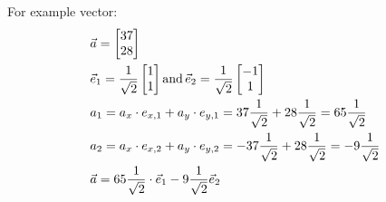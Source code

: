 \documentclass{article}
\begin{document}
For example vector:
\begin{align*}
    &\vec{a} = \begin{bmatrix}
        37 \\ 28
    \end{bmatrix} \\
    &\vec{e}_1 = \frac{1}{\sqrt{2}}  \begin{bmatrix} 1 \\ 1\end{bmatrix}  \textnormal{and} \,
    \vec{e}_2 = \frac{1}{\sqrt{2}} \begin{bmatrix}  -1 \\ 1\end{bmatrix} \\
    &a_1 = a_x \cdot e_{x,1} + a_y \cdot e_{y,1} = 37  \frac{1}{\sqrt{2}} + 28  \frac{1}{\sqrt{2}} = 65 \frac{1}{\sqrt{2}} \\
    &a_2 = a_x \cdot e_{x,2} + a_y \cdot e_{y,2} = - 37  \frac{1}{\sqrt{2}} + 28  \frac{1}{\sqrt{2}} = -9 \frac{1}{\sqrt{2}} \\
    &\vec{a} = 65 \frac{1}{\sqrt{2}} \cdot \vec{e}_1 - 9 \frac{1}{\sqrt{2}} \vec{e}_2
\end{align*}
\end{document}
